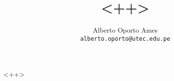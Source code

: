 \documentclass[12pt]{article}
\title{\textbf{<++>}}
\author{
		Alberto Oporto Ames\\
		\texttt{alberto.oporto@utec.edu.pe}\\
		}
\begin{document}
\maketitle
\thispagestyle{fancy}

<++>
\end{document}
